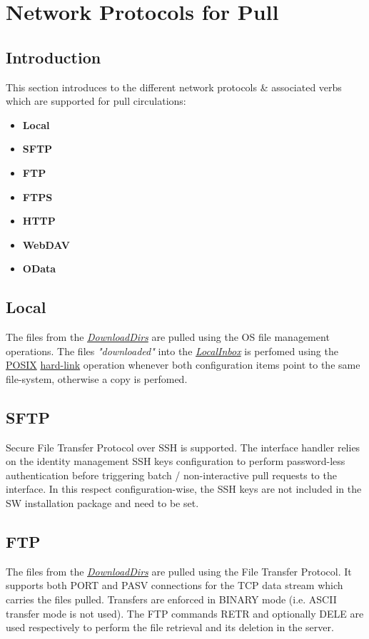\documentclass[dec_sum_main.tex]{subfiles}
\begin{document}
\section{Network Protocols for Pull}

\subsection{Introduction}
This section introduces to the different network protocols \& associated verbs which are supported for pull circulations:

\begin{itemize}
	\item \textbf{Local}
	\item \textbf{SFTP}
	\item \textbf{FTP}
	\item \textbf{FTPS}
	\item \textbf{HTTP}
	\item \textbf{WebDAV}
	\item \textbf{OData}
\end{itemize}

\subsection{Local}
The files from the \hyperref[DownloadDirs]{\textit{DownloadDirs}} are 
pulled using the OS file management operations. 
The files \textit{"downloaded"} into the \hyperref[LocalInbox]{\textit{LocalInbox}} is perfomed using the \hyperlink{https://en.wikipedia.org/wiki/POSIX}{POSIX} \hyperlink{https://en.wikipedia.org/wiki/Hard_link}{hard-link} operation whenever both configuration items point to the same file-system, otherwise a copy is perfomed.

\subsection{SFTP}
Secure File Transfer Protocol over SSH is supported. The interface handler relies on the identity management SSH keys configuration to perform password-less authentication before triggering batch / non-interactive pull requests to the interface. In this respect configuration-wise, the SSH keys are not included in the SW installation package and need to be set.

\subsection{FTP}
The files from the \hyperref[DownloadDirs]{\textit{DownloadDirs}} are 
pulled using the File Transfer Protocol. It supports both PORT and PASV connections for the TCP data stream which carries the files pulled. Transfers are enforced in BINARY mode (i.e. ASCII transfer mode is not used). The FTP commands RETR and optionally DELE are used respectively to perform the file retrieval and its deletion in the server.
\end{document}
